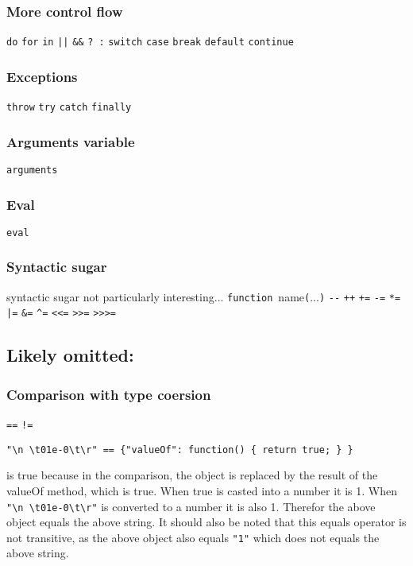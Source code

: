 \subsubsection{More control flow}
\verb|do|
\verb|for|
\verb|in|
\verb$||$ 
\verb|&&|
\verb|? :|
\verb|switch|
\verb|case|
\verb|break|
\verb|default|
\verb|continue|


\subsubsection{Exceptions}
\verb|throw|
\verb|try|
\verb|catch|
\verb|finally|

\subsubsection{Arguments variable}
\verb|arguments|

\subsubsection{Eval}
\verb|eval|

\subsubsection{Syntactic sugar}
syntactic sugar not particularly interesting...
\verb|function|~name\verb|(|...\verb|)|
\verb|--|
\verb|++|
\verb|+=|
\verb|-=|
\verb|*=|
\verb$|=$
\verb|&=|
\verb|^=|
\verb|<<=|
\verb|>>=|
\verb|>>>=|

\subsection{Likely omitted:}
\subsubsection{Comparison with type coersion}
\verb|==|
\verb|!=|

\begin{verbatim}
"\n \t01e-0\t\r" == {"valueOf": function() { return true; } } 
\end{verbatim}
is true because in the comparison, the object is replaced by the result of the valueOf method, which is true. When true is casted into a number it is 1. When \verb|"\n \t01e-0\t\r"| is converted to a number it is also 1. Therefor the above object equals the above string. It should also be noted that this equals operator is not transitive, as the above object also equals \verb|"1"| which does not equals the above string.

